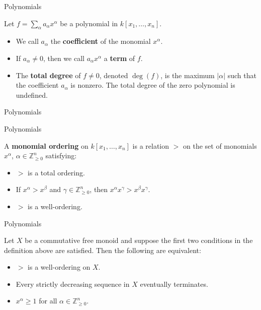 \documentclass{beamer}
\def\bZ{\mathbb{Z}}
\begin{document}
\begin{frame}{Polynomials}
  \begin{definition}
    Let $f = \sum_\alpha a_\alpha x^\alpha$ be a polynomial in $k[x_1,\dots,x_n]$.
    \begin{itemize}
      \item<2-> We call $a_\alpha$ the \textbf{coefficient} of the monomial $x^\alpha$.
      \item<3-> If $a_\alpha\ne0$, then we call $a_\alpha x^\alpha$ a \textbf{term} of $f$.
      \item<4-> The \textbf{total degree} of $f \ne 0$, denoted $\deg(f)$, is the maximum $|\alpha|$ such that the coefficient $a_\alpha$ is nonzero. The total degree of the zero polynomial is undefined.
    \end{itemize}
  \end{definition}
\end{frame}

\begin{frame}{Polynomials}
\end{frame}

\begin{frame}{Polynomials}
  \begin{definition}
    A \textbf{monomial ordering} on $k[x_1,\dots,x_n]$ is a relation $>$ on the set of monomials $x^\alpha$, $\alpha \in \bZ_{\ge0}^n$ satisfying:
    \begin{itemize}
      \item<2-> $>$ is a total ordering.
      \item<3-> If $x^\alpha > x^\beta$ and $\gamma \in \bZ_{\ge0}^n$, then $x^\alpha x^\gamma > x^\beta x^\gamma$.
      \item<4-> $>$ is a well-ordering.
    \end{itemize}
  \end{definition}
\end{frame}

\begin{frame}{Polynomials}
  \begin{theorem}
    Let $X$ be a commutative free monoid and suppose the first two conditions in the definition above are satisfied. Then the following are equivalent:
    \begin{itemize}
      \item<2-> $>$ is a well-ordering on $X$.
      \item<3-> Every strictly decreasing sequence in $X$ eventually terminates.
      \item<4-> $x^\alpha\ge1$ for all $\alpha \in \bZ_{\ge0}^n$.
    \end{itemize}
  \end{theorem}
\end{frame}
\end{document}
